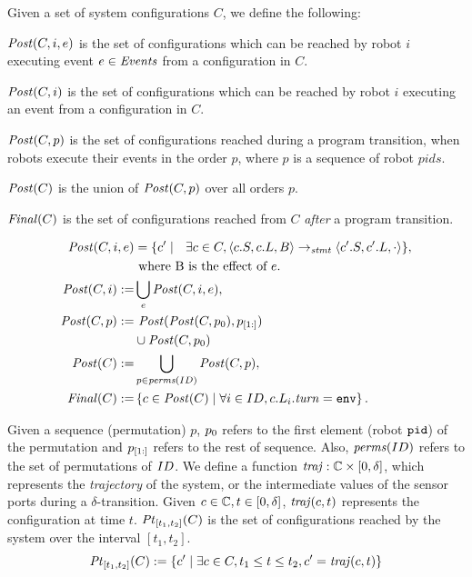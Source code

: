  Given a set of system configurations $C$, we define the following:
 \begin{inparaenum}[(i)]
     \item $\mathit{Post}(C,i,e)$ is the set of configurations which can be reached by robot $i$ executing event $e \in \mathit{Events}$ from a configuration in $C$.
     \item$\mathit{Post}(C,i)$ is the set of configurations which can be reached by robot $i$ executing an event from a configuration in $C$.
     \item$\mathit{Post}(C,p)$ is the set of configurations reached during a program transition, when robots execute their events in the order $p$, where $p$ is a sequence of robot $\mathit{pids}$.
     \item $\mathit{Post}(C)$ is the union of $\mathit{Post}(C,p)$ over all orders $p$.
     \item$\mathit{Final}(C)$ is the set of configurations reached from $C$ \emph{after} a program transition.
 \end{inparaenum}
\vspace{1mm}
\begin{mdframed}
\footnotesize
\begin{align*}
    \mathit{Post} (C,i,e) &= \{ c^\prime\mid \ \ \exists c \in C, \left\langle c.S, c.L, B \right\rangle \rightarrow_\mathit{stmt} \left\langle c^\prime.S, c^\prime.L, \cdot \right\rangle \},\\ &\mbox{ where B is the effect of }e.\\
\mathit{Post}(C,i) :=& \bigcup_e \mathit{Post}(C,i,e),\\
\mathit{Post}(C,p) := & \ \mathit{Post}(\mathit{Post}(C,p_0), p_{[1:]})\\ & \cup \mathit{Post}(C,p_0)\\
\mathit{Post}(C) :=& \bigcup_{p\in \mathit{perms}(ID)} \mathit{Post}(C,p), \\
\mathit{Final}(C) :=& \left\{ c\in \mathit{Post}(C)\mid \forall i \in ID, c.L_i.\mathit{turn} = \mathtt{env} \right\}.
\end{align*}
\end{mdframed}

Given a sequence (permutation) $p$, $p_0$ refers to the first element (robot $\texttt{pid}$) of the permutation and $p_{[1:]}$ refers to the rest of sequence. Also, $\mathit{perms}(ID)$ refers to the set of permutations of $ID$.
We define a function $\mathit{traj}: \mathbb{C} \times \left[0,\delta\right]$, which represents the \emph{trajectory} of the system, or the intermediate values of the sensor ports during a $\delta$-transition. Given $c\in \mathbb{C}, t\in \left[0,\delta\right]$, $\mathit{traj}(c,t)$ represents the configuration at time $t$. $\mathit{Pt}_{[t_1,t_2]}(C)$ is the set of configurations reached by the system over the interval $[t_1,t_2]$.
$$\mathit{Pt}_{[t_1,t_2]}(C) := \left\{c^\prime \mid \exists c\in C, t_1 \leq t\leq t_2 , c^\prime = \mathit{traj}(c,t)\right\}$$

